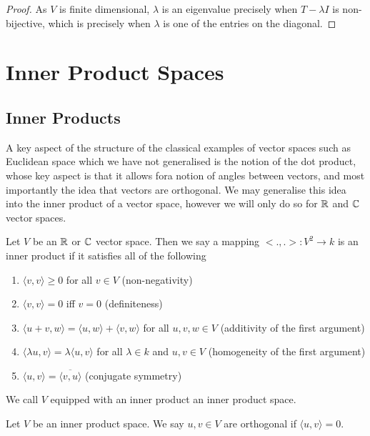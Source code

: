 \documentclass[]{article}
\begin{document}
\begin{proof}
		As $V$ is finite dimensional, $\lambda$ is an eigenvalue precisely when $T - \lambda I$ is non-bijective, which is precisely when $\lambda$ is one of the entries on the diagonal.
\end{proof}

\section{Inner Product Spaces}
		
\subsection{Inner Products}

A key aspect of the structure of the classical examples of vector spaces such as Euclidean space which we have not generalised is the notion of the dot product, whose key aspect is that it allows fora notion of angles between vectors, and most importantly the idea that vectors are orthogonal. We may generalise this idea into the inner product of a vector space, however we will only do so for $\mathbb{R}$ and $\mathbb{C}$ vector spaces.

\begin{defi} 
	Let $V$ be an $\mathbb{R}$ or $\mathbb{C}$ vector space. Then we say a mapping $<.,.>: V^2 \to k$ is an inner product if it satisfies all of the following
	\begin{enumerate}
			\item $\langle v, v \rangle \geq 0$ for all $v \in V$ (non-negativity)
			\item $\langle v, v \rangle = 0$ iff $v = 0$ (definiteness)
			\item $\langle u+v, w \rangle = \langle u, w \rangle + \langle v, w \rangle $ for all $u,v,w \in V$ (additivity of the first argument)
			\item $\langle \lambda u, v \rangle = \lambda \langle u, v \rangle $ for all $\lambda \in k$ and $u,v \in V$ (homogeneity of the first argument)
			\item $\langle u, v \rangle = \overline{\langle v, u \rangle }$ (conjugate symmetry)
	\end{enumerate}

	We call $V$ equipped with an inner product an inner product space.
\end{defi}

\begin{defi} [Orthogonality]
	Let $V$ be an inner product space. We say $u,v \in V$ are orthogonal if $\langle u, v \rangle = 0$.
\end{defi}
\end{document}
